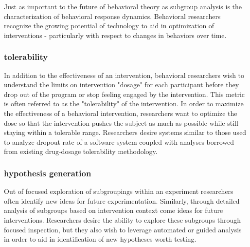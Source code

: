 Just as important to the future of behavioral theory as subgroup analysis is the characterization of behavioral response dynamics.
Behavioral researchers recognize the growing potential of technology to aid in optimization of interventions - particularly with respect to changes in behaviors over time. 

\subsubsection{tolerability} 
In addition to the effectiveness of an intervention, behavioral researchers wish to understand the limits on intervention "dosage" for each participant before they drop out of the program or stop feeling engaged by the intervention.
This metric is often referred to as the "tolerability" of the intervention.
In order to maximize the effectiveness of a behavioral intervention, researchers want to optimize the dose so that the intervention pushes the subject as much as possible while still staying within a tolerable range.
Researchers desire systems similar to those used to analyze dropout rate of a software system coupled with analyses borrowed from existing drug-dosage tolerability methodology.


\subsubsection{hypothesis generation}
Out of focused exploration of subgroupings within an experiment researchers often identify new ideas for future experimentation.
Similarly, through detailed analysis of subgroups based on intervention context come ideas for future interventions.
Researchers desire the ability to explore these subgroups through focused inspection, but they also wish to leverage automated or guided analysis in order to aid in identification of new hypotheses worth testing.

